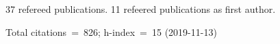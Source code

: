 37 refereed publications. 11 refeered publications as first author.

Total citations~=~826; h-index~=~15 (2019-11-13)
